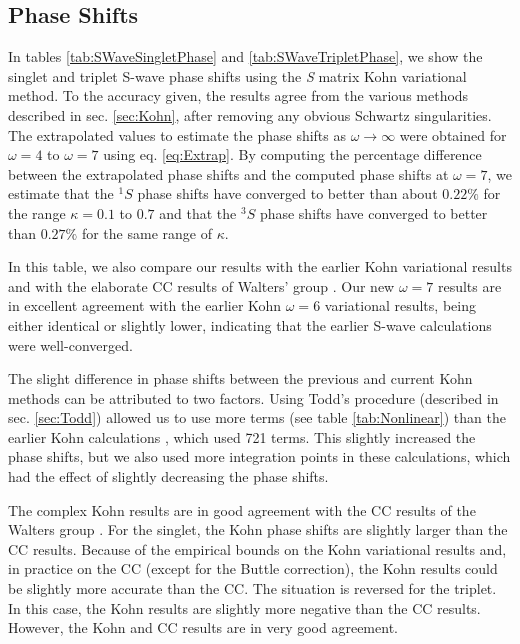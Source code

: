 \documentclass[preprint,showpacs,preprintnumbers,amsmath,amssymb]{revtex4}
\begin{document}
\subsection{Phase Shifts}

In tables \ref{tab:SWaveSingletPhase} and \ref{tab:SWaveTripletPhase}, we show the singlet and triplet S-wave phase shifts using the \emph{S} matrix Kohn variational method. To the accuracy given, the results agree from the various methods described in sec. \ref{sec:Kohn}, after removing any obvious Schwartz singularities. The extrapolated values to estimate the phase shifts as $\omega \rightarrow \infty$ were obtained for $\omega = 4$ to $\omega = 7$ using eq. \ref{eq:Extrap}. By computing the percentage difference between the extrapolated phase shifts and the computed phase shifts at $\omega=7$, we estimate that the $^1S$ phase shifts have converged to better than about $0.22\%$ for the range $\kappa=0.1$ to $0.7$ and that the $^3S$ phase shifts have converged to better than $0.27\%$ for the same range of $\kappa$.

In this table, we also compare our results with the earlier Kohn variational results \cite{VanReeth2003,VanReeth2004} and with the elaborate CC results of Walters' group \cite{Blackwood2002,Walters2004}. Our new $\omega = 7$ results are in excellent agreement with the earlier Kohn $\omega = 6$ variational results, being either identical or slightly lower, indicating that the earlier S-wave calculations were well-converged.

The slight difference in phase shifts between the previous and current Kohn methods can be attributed to two factors. Using Todd's procedure (described in sec. \ref{sec:Todd}) allowed us to use more terms (see table \ref{tab:Nonlinear}) than the earlier Kohn calculations \cite{VanReeth2003,VanReeth2004}, which used 721 terms. This slightly increased the phase shifts, but we also used more integration points in these calculations, which had the effect of slightly decreasing the phase shifts.

The complex Kohn results are in good agreement with the CC results of the Walters group \cite{Blackwood2002,Walters2004}. For the singlet, the Kohn phase shifts are slightly larger than the CC results. Because of the empirical bounds on the Kohn variational results and, in practice on the CC (except for the Buttle correction), the Kohn results could be slightly more accurate than the CC.
The situation is reversed for the triplet. In this case, the Kohn results are slightly more negative than the CC results.
However, the Kohn and CC results are in very good agreement.
\end{document}
